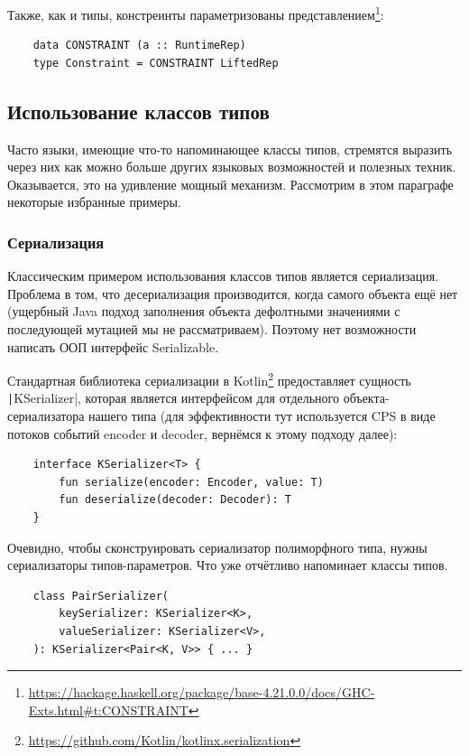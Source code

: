 Также, как и типы, констреинты параметризованы представлением\footnote{\url{https://hackage.haskell.org/package/base-4.21.0.0/docs/GHC-Exts.html\#t:CONSTRAINT}}:
\begin{verbatim}
    data CONSTRAINT (a :: RuntimeRep)
    type Constraint = CONSTRAINT LiftedRep
\end{verbatim}

\subsection{Использование классов типов}

Часто языки, имеющие что-то напоминающее классы типов, стремятся выразить через них как можно больше других языковых возможностей и полезных техник.
Оказывается, это на удивление мощный механизм.
Рассмотрим в этом параграфе некоторые избранные примеры.

\subsubsection{Сериализация}

Классическим примером использования классов типов является сериализация.
Проблема в том, что десериализация производится, когда самого объекта ещё нет (ущербный Java подход заполнения объекта дефолтными значениями с последующей мутацией мы не рассматриваем).
Поэтому нет возможности написать ООП интерфейс Serializable.

Стандартная библиотека сериализации в Kotlin\footnote{\url{https://github.com/Kotlin/kotlinx.serialization}} предоставляет сущность \texttt|KSerializer|, которая является интерфейсом для отдельного объекта-сериализатора нашего типа (для эффективности тут используется CPS в виде потоков событий encoder и decoder, вернёмся к этому подходу далее): %
\begin{verbatim}
    interface KSerializer<T> {
        fun serialize(encoder: Encoder, value: T)
        fun deserialize(decoder: Decoder): T
    }
\end{verbatim}

Очевидно, чтобы сконструировать сериализатор полиморфного типа, нужны сериализаторы типов-параметров.
Что уже отчётливо напоминает классы типов.
\begin{verbatim}
    class PairSerializer(
        keySerializer: KSerializer<K>,
        valueSerializer: KSerializer<V>,
    ): KSerializer<Pair<K, V>> { ... }
\end{verbatim}

